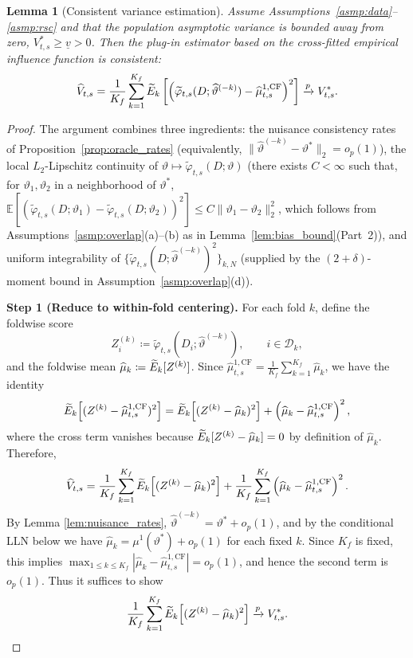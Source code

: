 \documentclass{article}
\newtheorem{lemma}[theorem]{Lemma}
\begin{document}
\begin{lemma}[Consistent variance estimation]\label{lem:var_est}
Assume Assumptions~\ref{asmp:data}--\ref{asmp:rsc} and that the population asymptotic variance is bounded away from zero, $V^*_{t,s}\ge \underline{v}>0$. Then the plug-in estimator based on the cross-fitted empirical influence function is consistent:
\[
\widehat{V}_{t,s} = \frac{1}{K_f} \sum_{k=1}^{K_f} \widetilde{E}_k \left[ \left( \widetilde{\varphi}_{t,s}(D; \widehat{\vartheta}^{(-k)}) - \widehat{\mu}^{1,\mathrm{CF}}_{t,s} \right)^2 \right] \xrightarrow{p} V^*_{t,s}.
\]
\end{lemma}

\begin{proof}
The argument combines three ingredients: the nuisance consistency rates of Proposition~\ref{prop:oracle_rates} (equivalently, $\|\widehat{\vartheta}^{(-k)}-\vartheta^*\|_2=o_p(1)$), the local $L_2$-Lipschitz continuity of $\vartheta\mapsto\widetilde{\varphi}_{t,s}(D;\vartheta)$ (there exists $C<\infty$ such that, for $\vartheta_1,\vartheta_2$ in a neighborhood of $\vartheta^*$, $\mathbb{E}[(\widetilde{\varphi}_{t,s}(D;\vartheta_1)-\widetilde{\varphi}_{t,s}(D;\vartheta_2))^2]\le C\|\vartheta_1-\vartheta_2\|_2^2$, which follows from Assumptions~\ref{asmp:overlap}(a)--(b) as in Lemma~\ref{lem:bias_bound}(Part~2)), and uniform integrability of $\{\widetilde{\varphi}_{t,s}(D;\widehat{\vartheta}^{(-k)})^2\}_{k,N}$ (supplied by the $(2+\delta)$-moment bound in Assumption~\ref{asmp:overlap}(d)).

\textbf{Step 1 (Reduce to within-fold centering).}
	For each fold $k$, define the foldwise score
	\[
	Z_{i}^{(k)} \coloneqq \widetilde{\varphi}_{t,s}(D_i;\widehat{\vartheta}^{(-k)}),
	\qquad i\in\mathcal{D}_k,
	\]
		and the foldwise mean $\widehat{\mu}_k\coloneqq \widetilde{E}_k[Z^{(k)}]$.
		Since $\widehat{\mu}^{1,\mathrm{CF}}_{t,s}=\frac{1}{K_f}\sum_{k=1}^{K_f}\widehat{\mu}_k$, we have the identity
		\[
		\widetilde{E}_k\!\left[(Z^{(k)}-\widehat{\mu}^{1,\mathrm{CF}}_{t,s})^2\right]
		=
		\widetilde{E}_k\!\left[(Z^{(k)}-\widehat{\mu}_k)^2\right]
		+
		\left(\widehat{\mu}_k-\widehat{\mu}^{1,\mathrm{CF}}_{t,s}\right)^2,
		\]
		where the cross term vanishes because $\widetilde{E}_k[Z^{(k)}-\widehat{\mu}_k]=0$ by definition of $\widehat{\mu}_k$.
		Therefore,
		\[
		\widehat{V}_{t,s}
		=
		\frac{1}{K_f}\sum_{k=1}^{K_f}\widetilde{E}_k\!\left[(Z^{(k)}-\widehat{\mu}_k)^2\right]
		+
		\frac{1}{K_f}\sum_{k=1}^{K_f}\left(\widehat{\mu}_k-\widehat{\mu}^{1,\mathrm{CF}}_{t,s}\right)^2.
		\]
	By Lemma \ref{lem:nuisance_rates}, 
    $\widehat{\vartheta}^{(-k)}=\vartheta^*+o_p(1)$, and by the conditional LLN below we have $\widehat{\mu}_k=\mu^1(\vartheta^*)+o_p(1)$ for each fixed $k$. Since $K_f$ is fixed, this implies
	\(
	\max_{1\le k\le K_f}\left|\widehat{\mu}_k-\widehat{\mu}^{1,\mathrm{CF}}_{t,s}\right| = o_p(1)
	\),
	and hence the second term is $o_p(1)$. Thus it suffices to show
	\[
	\frac{1}{K_f}\sum_{k=1}^{K_f}\widetilde{E}_k\!\left[(Z^{(k)}-\widehat{\mu}_k)^2\right]\xrightarrow{p}V^*_{t,s}.
	\]


\end{proof}
\end{document}
